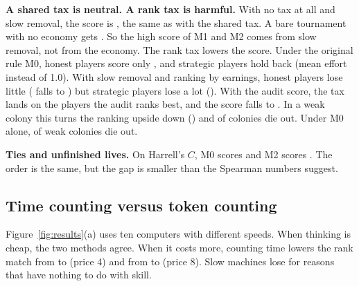 \documentclass[conference]{IEEEtran}
\theoremstyle{plain}
\begin{document}
\textbf{A shared tax is neutral. A rank tax is harmful.} With no tax at all and slow removal, the score is \NVLinGradAudit{}, the same as with the shared tax. A bare tournament with no economy gets \NVBare{}. So the high score of M1 and M2 comes from slow removal, not from the economy. The rank tax lowers the score. Under the original rule M0, honest players score only \NVMzeroH{}, and strategic players hold back (mean effort \NMidEffMyopic{} instead of 1.0). With slow removal and ranking by earnings, honest players lose little (\NVLinGrad{} falls to \NVRankGradGrossH{}) but strategic players lose a lot (\NVRankGradGrossS{}). With the audit score, the tax lands on the players the audit ranks best, and the score falls to \NVRankGradAuditH{}. In a weak colony this turns the ranking upside down (\NVWeakInverted{}) and \NExtWeakInverted{} of colonies die out. Under M0 alone, \NExtWeakMzero{} of weak colonies die out.

\textbf{Ties and unfinished lives.} On Harrell's $C$, M0 scores \NCMzeroH{} and M2 scores \NCMtwoH{}. The order is the same, but the gap is smaller than the Spearman numbers suggest.

\subsection{Time counting versus token counting}
Figure~\ref{fig:results}(a) uses ten computers with different speeds. When thinking is cheap, the two methods agree. When it costs more, counting time lowers the rank match from \NHwTokFour{} to \NHwTimeFour{} (price 4) and from \NHwTokEight{} to \NHwTimeEight{} (price 8). Slow machines lose for reasons that have nothing to do with skill.
\end{document}
